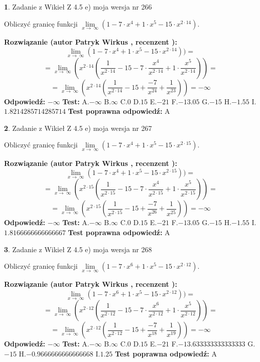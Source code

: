 \documentclass[12pt, a4paper]{article}
\theoremstyle{definition} %
\newtheorem{zad}{}
\newcommand{\zadStart}[1]{\begin{zad}#1\newline}
\newcommand{\zadStop}{\end{zad}}
\newcommand{\rozwStart}[2]{\noindent \textbf{Rozwiązanie (autor #1 , recenzent #2): }\newline}
\newcommand{\rozwStop}{\newline}
\newcommand{\odpStart}{\noindent \textbf{Odpowiedź:}\newline}
\newcommand{\odpStop}{\newline}
\newcommand{\testStart}{\noindent \textbf{Test:}\newline}
\newcommand{\testStop}{\newline}
\newcommand{\kluczStart}{\noindent \textbf{Test poprawna odpowiedź:}\newline}
\newcommand{\kluczStop}{\newline}
\begin{document}
\zadStart{Zadanie z Wikieł Z 4.5 e) moja wersja nr 266}


Obliczyć granicę funkcji  $\lim\limits_{x\to\ \infty}(1 - 7 \cdot x^{4}+1 \cdot x^{5}- 15 \cdot x^{2\cdot14})$.
\zadStop
\rozwStart{Patryk Wirkus}{}
$$\lim\limits_{x\to\ \infty}(1 - 7 \cdot x^{4}+1 \cdot x^{5}- 15 \cdot x^{2\cdot14}))=$$
$$=\lim\limits_{x\to\ \infty}(x^{2\cdot14}(\frac{1}{x^{2\cdot14}}-15 -7 \cdot \frac{x^{4}}{x^{2\cdot14}}+1 \cdot \frac{x^{5}}{x^{2\cdot14}}))=$$
$$=\lim\limits_{x\to\ \infty}(x^{2\cdot14}(\frac{1}{x^{2\cdot14}}-15 + \frac{-7}{x^{24}}+ \frac{1}{x^{23}}))=-\infty$$
\rozwStop
\odpStart
$-\infty$
\odpStop
\testStart
A.$-\infty$ B.$\infty$ C.$0$ D.$15$ E.$-21$
F.$-13.05$ G.$-15$
H.$-1.55$
I.$1.8214285714285714$
\testStop
\kluczStart
A
\kluczStop



\zadStart{Zadanie z Wikieł Z 4.5 e) moja wersja nr 267}


Obliczyć granicę funkcji  $\lim\limits_{x\to\ \infty}(1 - 7 \cdot x^{4}+1 \cdot x^{5}- 15 \cdot x^{2\cdot15})$.
\zadStop
\rozwStart{Patryk Wirkus}{}
$$\lim\limits_{x\to\ \infty}(1 - 7 \cdot x^{4}+1 \cdot x^{5}- 15 \cdot x^{2\cdot15}))=$$
$$=\lim\limits_{x\to\ \infty}(x^{2\cdot15}(\frac{1}{x^{2\cdot15}}-15 -7 \cdot \frac{x^{4}}{x^{2\cdot15}}+1 \cdot \frac{x^{5}}{x^{2\cdot15}}))=$$
$$=\lim\limits_{x\to\ \infty}(x^{2\cdot15}(\frac{1}{x^{2\cdot15}}-15 + \frac{-7}{x^{26}}+ \frac{1}{x^{25}}))=-\infty$$
\rozwStop
\odpStart
$-\infty$
\odpStop
\testStart
A.$-\infty$ B.$\infty$ C.$0$ D.$15$ E.$-21$
F.$-13.05$ G.$-15$
H.$-1.55$
I.$1.8166666666666667$
\testStop
\kluczStart
A
\kluczStop



\zadStart{Zadanie z Wikieł Z 4.5 e) moja wersja nr 268}


Obliczyć granicę funkcji  $\lim\limits_{x\to\ \infty}(1 - 7 \cdot x^{6}+1 \cdot x^{5}- 15 \cdot x^{2\cdot12})$.
\zadStop
\rozwStart{Patryk Wirkus}{}
$$\lim\limits_{x\to\ \infty}(1 - 7 \cdot x^{6}+1 \cdot x^{5}- 15 \cdot x^{2\cdot12}))=$$
$$=\lim\limits_{x\to\ \infty}(x^{2\cdot12}(\frac{1}{x^{2\cdot12}}-15 -7 \cdot \frac{x^{6}}{x^{2\cdot12}}+1 \cdot \frac{x^{5}}{x^{2\cdot12}}))=$$
$$=\lim\limits_{x\to\ \infty}(x^{2\cdot12}(\frac{1}{x^{2\cdot12}}-15 + \frac{-7}{x^{18}}+ \frac{1}{x^{19}}))=-\infty$$
\rozwStop
\odpStart
$-\infty$
\odpStop
\testStart
A.$-\infty$ B.$\infty$ C.$0$ D.$15$ E.$-21$
F.$-13.633333333333333$ G.$-15$
H.$-0.9666666666666668$
I.$1.25$
\testStop
\kluczStart
A
\kluczStop
\end{document}
